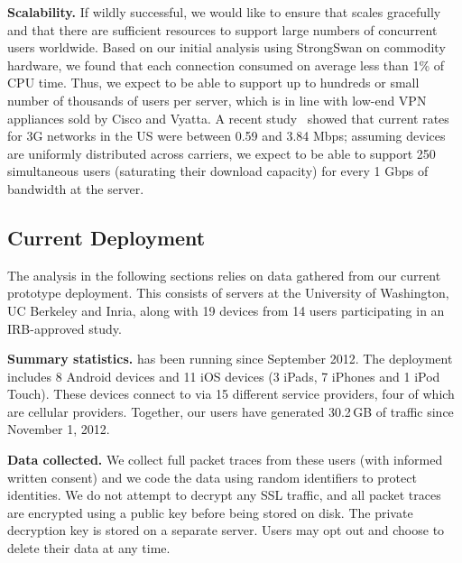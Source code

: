 \noindent\textbf{Scalability.} If wildly successful, we would like to
ensure that \meddle scales gracefully and that there are sufficient
resources to support large numbers of concurrent users
worldwide. Based on our initial analysis using StrongSwan on commodity
hardware, we found that each connection consumed on average less than
1\% of CPU time. Thus, we expect to be able to support up to hundreds or
small number of thousands of users per server, which is in line with
low-end VPN appliances sold by Cisco and Vyatta. A recent
study~\cite{pcworld-speedtests} showed that current rates for 3G
networks in the US were between 0.59 and 3.84 Mbps; assuming devices
are uniformly distributed across carriers, we expect to be able to
support 250 simultaneous users (saturating their download capacity)
for every 1 Gbps of bandwidth at the server.

\subsection{Current Deployment}
\label{subsec:currdeploy}
The analysis in the following sections relies on data gathered from 
our current prototype deployment. This consists of \meddle servers at the University of Washington, 
UC Berkeley and Inria, along with 19 devices from 14 users participating 
in an IRB-approved study. 

\noindent\textbf{Summary statistics.} \meddle has been running 
since September 2012. The deployment includes 8 Android devices 
and 11 iOS devices (3 iPads, 7 iPhones and 1 iPod Touch). These 
devices connect to \meddle via 15 different service providers, 
four of which are cellular providers. Together, our users have 
generated 30.2\,GB of traffic since November 1, 2012. 

\noindent\textbf{Data collected.}
We collect full packet traces from these users 
(with informed written consent) and we code the data using random identifiers 
to protect identities. We do not attempt to decrypt any SSL traffic, 
and all packet traces are encrypted using a public key before being 
stored on disk. The private decryption key is stored on a separate server. 
Users may opt out and choose to delete their data at any time. 



   

 
 
